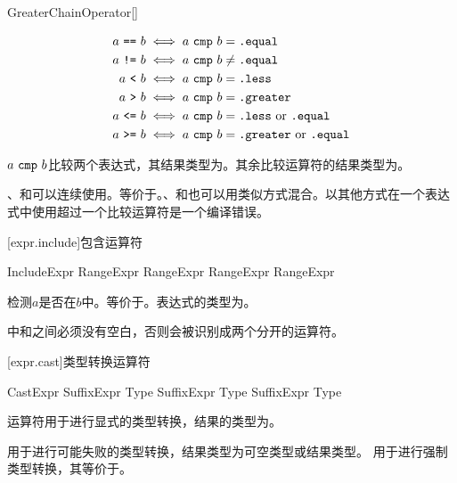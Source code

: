 \begin{bnf}{GreaterChainOperator}[\oneof]
    \terminal{> == >=}
\end{bnf}

\begin{align*}
a\ \tcode{==}\ b &\iff a\ \tcode{cmp}\ b = \tcode{.equal} \\
a\ \tcode{!=}\ b &\iff a\ \tcode{cmp}\ b \ne \tcode{.equal} \\
a\ \tcode{<}\ b &\iff a\ \tcode{cmp}\ b = \tcode{.less} \\
a\ \tcode{>}\ b &\iff a\ \tcode{cmp}\ b = \tcode{.greater} \\
a\ \tcode{<=}\ b &\iff a\ \tcode{cmp}\ b = \tcode{.less}\ \mathrm{or} \ \tcode{.equal} \\
a\ \tcode{>=}\ b &\iff a\ \tcode{cmp}\ b = \tcode{.greater}\ \mathrm{or} \ \tcode{.equal} \\
\end{align*}

\pnum
$a\ \tcode{cmp}\ b$比较两个表达式，其结果类型为。其余比较运算符的结果类型为。

\pnum
\tcode{<}、\tcode{<=}和\tcode{==}可以连续使用。等价于。\tcode{>}、\tcode{>=}和\tcode{==}也可以用类似方式混合。以其他方式在一个表达式中使用超过一个比较运算符是一个编译错误。

[expr.include]{包含运算符}

\begin{bnf}{IncludeExpr}
    RangeExpr  RangeExpr \br
    RangeExpr  RangeExpr
\end{bnf}

\pnum
{}检测$a$是否在$b$中。等价于。表达式的类型为。

\pnum
\enternote {}中\tcode{!}和之间必须没有空白，否则会被识别成两个分开的运算符。\exitnote

[expr.cast]{类型转换运算符}

\begin{bnf}{CastExpr}
    SuffixExpr  Type \br
    SuffixExpr  Type \br
    SuffixExpr  Type
\end{bnf}

\pnum
{}运算符用于进行显式的类型转换，结果的类型为。

\pnum
{}用于进行可能失败的类型转换，结果类型为可空类型或结果类型。
用于进行强制类型转换，其等价于。

